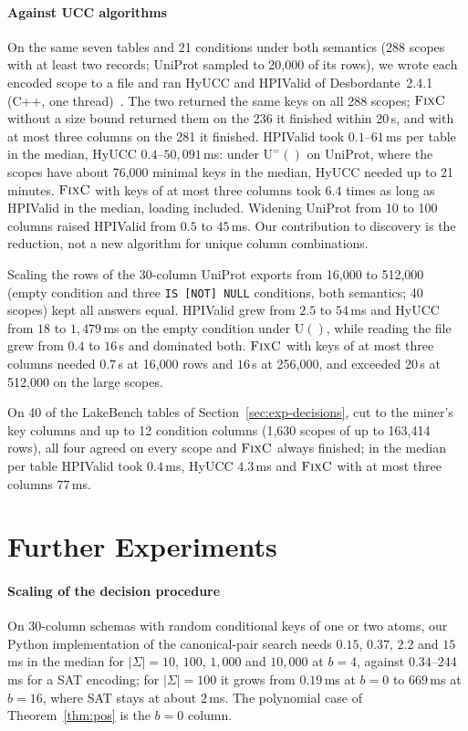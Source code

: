 \documentclass[conference]{IEEEtran}
\theoremstyle{definition}
\newcommand{\Sig}{\Sigma}
\newcommand{\U}[1]{\mathrm{U}(#1)}
\newcommand{\Ueq}[1]{\mathrm{U}^{=}(#1)}
\begin{document}
\paragraph*{Against UCC algorithms} On the same seven tables and 21 conditions under both
semantics (288 scopes with at least two records; UniProt sampled to 20{,}000 of its rows), we
wrote each encoded scope to a file and ran HyUCC and HPIValid of Desbordante~2.4.1 (C++, one
thread)~\cite{Desb}. The two returned the same keys on all 288 scopes; $\textsc{FixC}$ without a
size bound returned them on the 236 it finished within 20\,s, and with at most three columns on
the 281 it finished. HPIValid took $0.1$--$61$\,ms per table in the median, HyUCC $0.4$--$50{,}091$\,ms:
under $\Ueq{}$ on UniProt, where the scopes have about 76{,}000 minimal keys in the median, HyUCC
needed up to 21 minutes. $\textsc{FixC}$ with keys of at most three columns took $6.4$ times as
long as HPIValid in the median, loading included. Widening UniProt from 10 to 100 columns raised
HPIValid from $0.5$ to $45$\,ms. Our contribution to discovery is the reduction, not a new
algorithm for unique column combinations.

Scaling the rows of the 30-column UniProt exports from 16{,}000 to 512{,}000 (empty condition and
three \texttt{IS [NOT] NULL} conditions, both semantics; 40 scopes) kept all answers equal.
HPIValid grew from $2.5$ to $54$\,ms and HyUCC from $18$ to $1{,}479$\,ms on the empty condition
under $\U{}$, while reading the file grew from $0.4$ to $16$\,s and dominated both. $\textsc{FixC}$
with keys of at most three columns needed $0.7$\,s at 16{,}000 rows and $16$\,s at 256{,}000, and
exceeded 20\,s at 512{,}000 on the large scopes.

On 40 of the LakeBench tables of Section~\ref{sec:exp-decisions}, cut to the miner's key columns and
up to 12 condition columns (1{,}630 scopes of up to 163{,}414 rows), all four agreed on every scope
and $\textsc{FixC}$ always finished; in the median per table HPIValid took $0.4$\,ms, HyUCC
$4.3$\,ms and $\textsc{FixC}$ with at most three columns $77$\,ms.

\section{Further Experiments}\label{app:exp}

\paragraph*{Scaling of the decision procedure} On 30-column schemas with random conditional keys
of one or two atoms, our Python implementation of the canonical-pair search needs $0.15$, $0.37$,
$2.2$ and $15$\,ms in the median for $|\Sig|=10$, $100$, $1{,}000$ and $10{,}000$ at $b=4$, against
$0.34$--$244$\,ms for a SAT encoding; for $|\Sig|=100$ it grows from $0.19$\,ms at $b=0$ to
$669$\,ms at $b=16$, where SAT stays at about $2$\,ms. The polynomial case of
Theorem~\ref{thm:pos} is the $b=0$ column.
\end{document}

